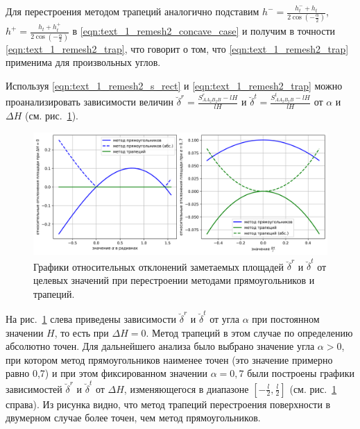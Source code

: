Для перестроения методом трапеций аналогично подставим $h^{-} = \frac{h_t^{-} + h_t}{2 \cos\left( -\frac{\alpha}{2} \right)}$, $h^{+} = \frac{h_t + h_t^{+}}{2 \cos\left( -\frac{\alpha}{2} \right)}$ в \eqref{eqn:text_1_remesh2_concave_case} и получим в точности \eqref{eqn:text_1_remesh2_trap}, что говорит о том, что \eqref{eqn:text_1_remesh2_trap} применима для произвольных углов.

Используя \eqref{eqn:text_1_remesh2_s_rect} и \eqref{eqn:text_1_remesh2_trap} можно проанализировать зависимости величин $\breve{\delta}^r = \frac{S_{AA_2B_2B}^r - lH}{lH}$ и $\breve{\delta}^t = \frac{S_{AA_2B_2B}^t - lH}{lH}$ от $\alpha$ и $\Delta H$ (см. рис.~\ref{fig:text_1_remesh_2d_main_chart}).

\begin{figure}[ht]
\centering
\includegraphics[width=1.0\textwidth]{pics/text_1_remesh_2d/main_chart.png}
\singlespacing
{}\caption{Графики относительных отклонений заметаемых площадей $\breve{\delta}^r$ и $\breve{\delta}^t$ от целевых значений при перестроении методами прямоугольников и трапеций.}
\label{fig:text_1_remesh_2d_main_chart}
\end{figure}

На рис.~\ref{fig:text_1_remesh_2d_main_chart} слева приведены зависимости $\breve{\delta}^r$ и $\breve{\delta}^t$ от угла $\alpha$ при постоянном значении $H$, то есть при $\Delta H = 0$.
Метод трапеций в этом случае по определению абсолютно точен.
Для дальнейшего анализа было выбрано значение угла $\alpha > 0$, при котором метод прямоугольников наименее точен (это значение примерно равно 0,7) и при этом фиксированном значении $\alpha = 0,7$ были построены графики зависимостей $\breve{\delta}^r$ и $\breve{\delta}^t$ от $\Delta H$, изменяющегося в диапазоне $[-\frac{l}{2}, \frac{l}{2}]$ (см. рис.~\ref{fig:text_1_remesh_2d_main_chart} справа).
Из рисунка видно, что метод трапеций перестроения поверхности в двумерном случае более точен, чем метод прямоугольников.
